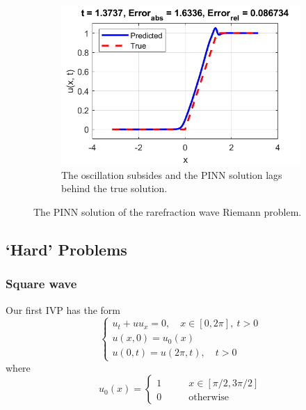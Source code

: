 \documentclass{myproject}
\begin{document}
\begin{figure}
\begin{subfigure}{.48\textwidth}
        \includegraphics[width=1\textwidth]{t137_NN_rarefraction.png}
        \caption{The oscillation subsides and the PINN solution lags behind the true solution.}
    \end{subfigure}
    \caption{The PINN solution of the rarefraction wave Riemann problem.}
\end{figure}








\subsection{`Hard' Problems}

\subsubsection{Square wave}

Our first IVP has the form
\begin{equation}\label{square_wave}
    \begin{cases}
        u_t + uu_x = 0, \quad x \in [0, 2\pi], \: t>0 \\
        u(x,0) = u_0(x) \\
        u(0,t) = u(2\pi,t), \quad t > 0
    \end{cases}
\end{equation}
where
\begin{equation}
    u_0(x) = 
    \begin{cases}
        1 \qquad &  x \in [\pi/2, 3\pi/2] \\
        0 \qquad & \text{otherwise} 
    \end{cases}
\end{equation}
\end{document}
